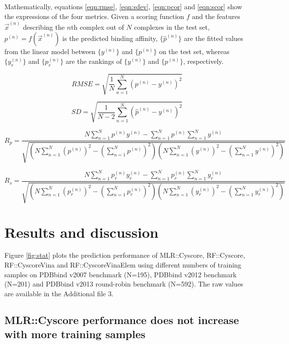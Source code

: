 \documentclass[linenumbers]{bmcart}
\begin{document}
Mathematically, equations \ref{eqn:rmse}, \ref{eqn:sdev}, \ref{eqn:pcor} and \ref{eqn:scor} show the expressions of the four metrics. Given a scoring function $f$ and the features $\overrightarrow{x}^{(n)}$ describing the $n$th complex out of $N$ complexes in the test set, $p^{(n)}=f(\overrightarrow{x}^{(n)})$ is the predicted binding affinity, $\{\hat{p}^{(n)}\}$ are the fitted values from the linear model between $\{y^{(n)}\}$ and $\{p^{(n)}\}$ on the test set, whereas $\{y_r^{(n)}\}$ and $\{p_r^{(n)}\}$ are the rankings of $\{y^{(n)}\}$ and $\{p^{(n)}\}$, respectively.

\begin{equation}
RMSE = \sqrt{\frac{1}{N}\sum_{n=1}^N(p^{(n)}-y^{(n)})^2}
\label{eqn:rmse}
\end{equation}

\begin{equation}
SD = \sqrt{\frac{1}{N-2}\sum_{n=1}^N(\hat{p}^{(n)}-y^{(n)})^2}
\label{eqn:sdev}
\end{equation}

\begin{equation}
R_p = \frac{N\sum_{n=1}^Np^{(n)}y^{(n)}-\sum_{n=1}^Np^{(n)}\sum_{n=1}^Ny^{(n)}}{\sqrt{(N\sum_{n=1}^N(p^{(n)})^2-(\sum_{n=1}^Np^{(n)})^2)(N\sum_{n=1}^N(y^{(n)})^2-(\sum_{n=1}^Ny^{(n)})^2)}}
\label{eqn:pcor}
\end{equation}

\begin{equation}
R_s = \frac{N\sum_{n=1}^Np_r^{(n)}y_r^{(n)}-\sum_{n=1}^Np_r^{(n)}\sum_{n=1}^Ny_r^{(n)}}{\sqrt{(N\sum_{n=1}^N(p_r^{(n)})^2-(\sum_{n=1}^Np_r^{(n)})^2)(N\sum_{n=1}^N(y_r^{(n)})^2-(\sum_{n=1}^Ny_r^{(n)})^2)}}
\label{eqn:scor}
\end{equation}

\section*{Results and discussion}

Figure \ref{fig:stat} plots the prediction performance of MLR::Cyscore, RF::Cyscore, RF::CyscoreVina and RF::CyscoreVinaElem using different numbers of training samples on PDBbind v2007 benchmark (N=195), PDBbind v2012 benchmark (N=201) and PDBbind v2013 round-robin benchmark (N=592). The raw values are available in the Additional file 3.

\subsection*{MLR::Cyscore performance does not increase with more training samples}
\end{document}
